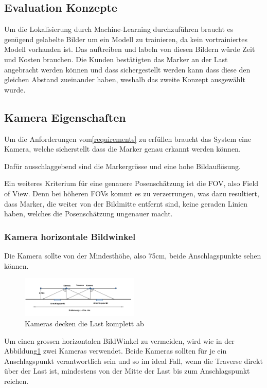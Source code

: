 \subsection{Evaluation Konzepte}
Um die Lokalisierung durch Machine-Learning durchzuführen braucht es genügend gelabelte Bilder um ein Modell zu trainieren, da kein vortrainiertes Modell vorhanden ist. Das auftreiben und labeln von diesen Bildern würde Zeit und Kosten brauchen. Die Kunden bestätigten das Marker an der Last angebracht werden können und dass sichergestellt werden kann dass diese den gleichen Abstand zueinander haben, weshalb das zweite Konzept ausgewählt wurde.

\subsection{Kamera Eigenschaften}

Um die Anforderungen vom\ref{requirements} zu erfüllen braucht das System eine Kamera, welche sicherstellt dass die Marker genau erkannt werden können.

Dafür ausschlaggebend sind die Markergrösse und eine hohe Bildauflösung\cite{noauthor_designing_2020}. 

Ein weiteres Kriterium für eine genauere Posenschätzung ist die FOV, also Field of View. 
Denn bei höheren FOVs kommt es zu verzerrungen, was dazu resultiert, dass Marker, die weiter von der Bildmitte entfernt sind, keine geraden Linien haben, welches die Posenschätzung ungenauer macht.


\subsubsection{Kamera horizontale Bildwinkel}

Die Kamera sollte von der Mindesthöhe, also 75cm, beide Anschlagspunkte sehen können.

\begin{figure}[H]
    \centering
    \includegraphics[width=0.5\textwidth]{graphics/KameraFOV.png}\hfill%
    \caption{Kameras decken die Last komplett ab}
    \label{fig:FOV}
\end{figure}

Um einen grossen horizontalen BildWinkel zu vermeiden, wird wie in der Abbildung\ref{fig:FOV} zwei Kameras verwendet. 
Beide Kameras sollten für je ein Anschlagspunkt verantwortlich sein und so im ideal Fall, wenn die Traverse direkt über der Last ist, mindestens von der Mitte der Last bis zum Anschlagspunkt reichen.

